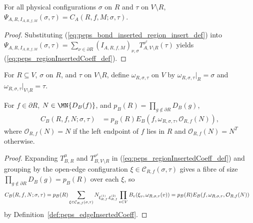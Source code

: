 \begin{lemma}
    \label{thm:peps_deformedRegionState_bondInsertedRegionInsert}
    \leanok
    For all physical configurations $\sigma$ on $R$ and $\tau$ on $V\setminus R$,
    $\Psi_{A,R,I_{A,R,f,M}}(\sigma,\tau)=C_A(R,f,M;\sigma,\tau)$.
\end{lemma}
\begin{proof}\leanok
    Substituting (\ref{eq:peps_bond_inserted_region_insert_def}) into
    $\Psi_{A,R,I_{A,R,f,M}}(\sigma,\tau)=\sum_{\nu\in\partial R}(I_{A,R,f,M})_{\nu,\sigma}T_{A,V\setminus R}^{\nu^c}(\tau)$
    yields (\ref{eq:peps_regionInsertedCoeff_def}).
\end{proof}

For $R\subseteq V$, $\sigma$ on $R$, and $\tau$ on $V\setminus R$, define
$\omega_{R,\sigma,\tau}$ on $V$ by $\omega_{R,\sigma,\tau}|_R=\sigma$ and
$\omega_{R,\sigma,\tau}|_{V\setminus R}=\tau$.

\begin{lemma}
    \label{thm:peps_regionInsertedCoeff_eq_smul_edgeInsertedCoeff}
    \leanok
    For $f\in\partial R$, $N\in\MN{D_B(f)}$, and
    $p_B(R)=\prod_{g\notin\partial R}D_B(g)$,
    \begin{align}
        C_B(R,f,N;\sigma,\tau)
         & =
        p_B(R)
        E_B(f,\omega_{R,\sigma,\tau},\mathcal O_{R,f}(N)),
        \label{eq:peps_region_as_edge_insertion}
    \end{align}
    where $\mathcal O_{R,f}(N)=N$ if the left endpoint of $f$ lies in $R$ and
    $\mathcal O_{R,f}(N)=N^T$ otherwise.
\end{lemma}
\begin{proof}\leanok
    Expanding $T_{B,R}^{\mu}$ and $T_{B,V\setminus R}^{\nu^c}$ in
    (\ref{eq:peps_regionInsertedCoeff_def}) and grouping by the open-edge
    configuration $\xi\in\mathcal C_{R,f}(\sigma,\tau)$ gives a fibre of size
    $\prod_{g\notin\partial R}D_B(g)=p_B(R)$ over each $\xi$, so
    \begin{align}
        C_B(R,f,N;\sigma,\tau)
         & =
        p_B(R)
        \sum_{\xi\in\mathcal C_{R,f}(\sigma,\tau)}
        N_{\xi_{R,f}^{(1)},\xi_{R,f}^{(2)}}
        \prod_{v\in V}
        B_v(\xi_v,\omega_{R,\sigma,\tau}(v))
        =p_B(R)E_B(f,\omega_{R,\sigma,\tau},\mathcal O_{R,f}(N))
        \notag
    \end{align}
    by Definition~\ref{def:peps_edgeInsertedCoeff}.
\end{proof}

